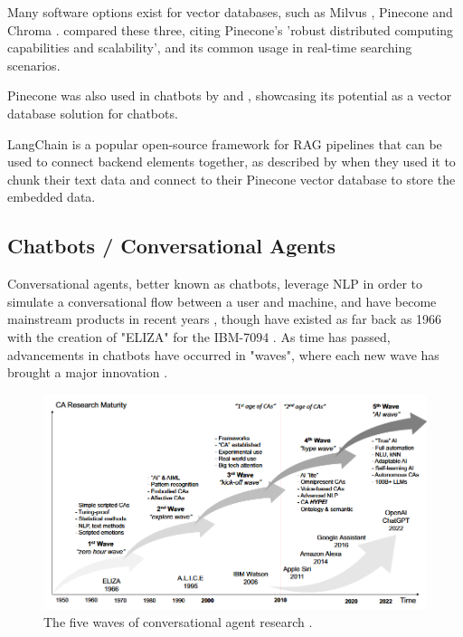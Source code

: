 \documentclass[12pt]{report}
\begin{document}
    Many software options exist for
    vector databases, such as Milvus \autocite{wang_milvus_2021}, Pinecone \autocite{pinecone_pinecone_nodate} and Chroma \autocite{chroma_chroma_nodate}.
    \textcite{xie_brief_2023} compared these three, citing Pinecone's 'robust distributed computing capabilities and scalability', and its common usage 
    in real-time searching scenarios.
    
    Pinecone was also used in chatbots by \textcite{odede_jaybot_2024} and \textcite{singer_development_2024}, showcasing its potential as a vector database solution
    for chatbots.

    LangChain \autocite{langchain_introduction_nodate} is a popular open-source framework for RAG pipelines that can be used to connect backend elements 
    together, as described by \textcite{singer_development_2024} when they used it to chunk their text data and connect to their Pinecone vector database to store 
    the embedded data. 
    


    \subsection{Chatbots / Conversational Agents}

    Conversational agents, better known as chatbots, leverage NLP in order to simulate a conversational flow 
    between a user and machine, and have become mainstream products in recent years \autocite{liao_all_2018},
    though have existed as far back as 1966 with the creation of "ELIZA" for the IBM-7094 \autocite{weizenbaum_elizacomputer_1966}.
    As time has passed, advancements in chatbots have occurred in "waves", where each new wave has brought a major innovation \autocite{schobel_charting_2024}.

    \begin{figure}[H] 
        \centering
        \includegraphics[width=.8\linewidth]{ChatbotWaves.png}
        \caption{The five waves of conversational agent research \autocite{schobel_charting_2024}.}
        \label{fig:ChatbotWaves}
    \end{figure}
\end{document}
